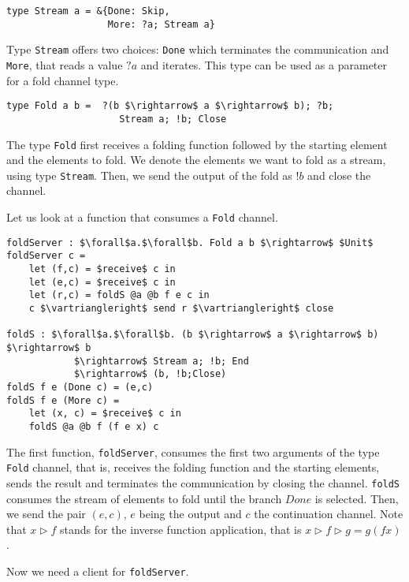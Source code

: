 \documentclass[sigplan]{acmart}
\begin{document}
\begin{lstlisting}
type Stream a = &{Done: Skip, 
                  More: ?a; Stream a}
\end{lstlisting}
Type \lstinline|Stream| offers two choices: \lstinline|Done| which terminates the communication and \lstinline|More|, that reads a value $?a$ and iterates.
This type can be used as a parameter for a fold channel type.

\begin{lstlisting}
type Fold a b =  ?(b $\rightarrow$ a $\rightarrow$ b); ?b;
                    Stream a; !b; Close
\end{lstlisting}
\vspace{3mm}

The type \lstinline|Fold| first receives a folding function followed by the starting element and the elements to fold. We denote the elements we want to fold as a stream, using type \lstinline|Stream|. Then, we send the output of the fold as $!b$ and close the channel.

Let us look at a function that consumes a \lstinline|Fold| channel.

\begin{lstlisting}
foldServer : $\forall$a.$\forall$b. Fold a b $\rightarrow$ $Unit$
foldServer c = 
    let (f,c) = $receive$ c in 
    let (e,c) = $receive$ c in 
    let (r,c) = foldS @a @b f e c in
    c $\vartriangleright$ send r $\vartriangleright$ close
               
foldS : $\forall$a.$\forall$b. (b $\rightarrow$ a $\rightarrow$ b) $\rightarrow$ b 
            $\rightarrow$ Stream a; !b; End 
            $\rightarrow$ (b, !b;Close)
foldS f e (Done c) = (e,c)
foldS f e (More c) = 
    let (x, c) = $receive$ c in
    foldS @a @b f (f e x) c
\end{lstlisting}
\vspace{3mm}
The first function, \lstinline|foldServer|, consumes the first two arguments of the type \lstinline|Fold| channel, that is, receives the folding function and the starting elements, sends the result and terminates the communication by closing the channel. \lstinline|foldS| consumes the stream of elements to fold until the branch $Done$ is selected. Then, we send the pair $(e,c)$, $e$ being the output and $c$ the continuation channel.
Note that $x \vartriangleright f$ stands for the inverse function application, that is $ x \vartriangleright f \vartriangleright g = g (f x)$.

Now we need a client for \lstinline|foldServer|. 
\end{document}
